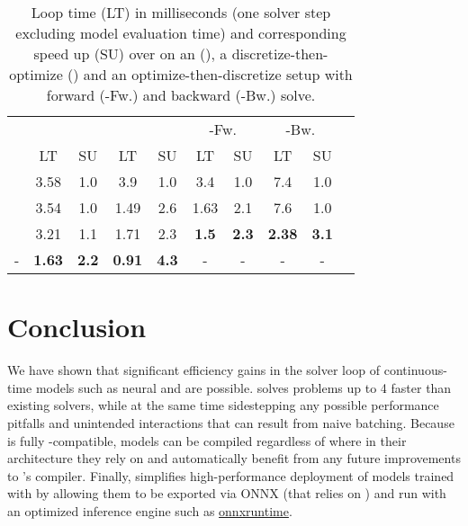 \documentclass{article}
\begin{document}
\begin{table}[t]
\centering
  \caption{Loop time (LT) in milliseconds (one solver step excluding model evaluation time) and corresponding speed up (SU) over \torchdiffeq{} on an \ODE{} (\vdp{}), a discretize-then-optimize (\fen{}) and an optimize-then-discretize setup with forward (\cnf{}-Fw.) and backward (\cnf{}-Bw.) solve.}\label{table:benchmark}
  \begin{tabular}{rccccccccc}
    \toprule
    {} & \multicolumn{2}{c}{\vdp{}} & \multicolumn{2}{c}{\fen{}} & \multicolumn{2}{c}{\cnf{}-Fw.} & \multicolumn{2}{c}{\cnf{}-Bw.} \\
    \cmidrule(lr){2-3}\cmidrule(lr){4-5}\cmidrule(lr){6-7}\cmidrule(lr){8-9}
    {} & LT & SU & LT & SU & LT & SU & LT & SU \\
    \midrule
    \torchdiffeq{} & 3.58 & \texttimes{}1.0 & 3.9 & \texttimes{}1.0 & 3.4 & \texttimes{}1.0 & 7.4 & \texttimes{}1.0 \\
    \torchdyn{} & 3.54 & \texttimes{}1.0 & 1.49 & \texttimes{}2.6 & 1.63 & \texttimes{}2.1 & 7.6 & \texttimes{}1.0 \\
    \torchode{} & 3.21 & \texttimes{}1.1 & 1.71 & \texttimes{}2.3 & \textbf{1.5} & \texttimes{}\textbf{2.3} & \textbf{2.38} & \texttimes{}\textbf{3.1} \\
    \torchode{}-\jit{} & \textbf{1.63} & \texttimes{}\textbf{2.2} & \textbf{0.91} & \texttimes{}\textbf{4.3} & - & - & - & - \\
    \bottomrule
  \end{tabular}
\end{table}

\section{Conclusion}\label{sec:conclusion}

We have shown that significant efficiency gains in the solver loop of continuous-time models such as neural \ODEs{} and \cnfs{} are possible. \torchode{} solves \ODE{} problems up to 4\texttimes{} faster than existing \pytorch{} solvers, while at the same time sidestepping any possible performance pitfalls and unintended interactions that can result from naive batching. Because \torchode{} is fully \jit{}-compatible, models can be \jit{} compiled regardless of where in their architecture they rely on \ODEs{} and automatically benefit from any future improvements to \pytorch{}'s \jit{} compiler. Finally, \torchode{} simplifies high-performance deployment of \ODE{} models trained with \pytorch{} by allowing them to be exported via ONNX (that relies on \jit{}) and run with an optimized inference engine such as \href{https://onnxruntime.ai}{onnxruntime}.
\end{document}
